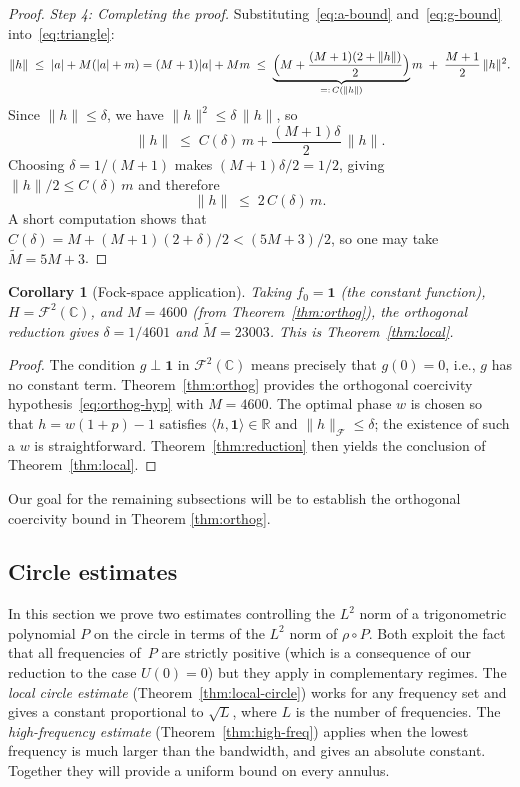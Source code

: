 \documentclass[11pt]{amsart}
\newtheorem{corollary}[theorem]{Corollary}
\theoremstyle{remark}
\begin{document}
\begin{proof}
\medskip
\noindent
\emph{Step 4: Completing the proof.}\;
Substituting~\eqref{eq:a-bound} and~\eqref{eq:g-bound}
into~\eqref{eq:triangle}:
\[
\lVert h \rVert
\;\le\;
\lvert a \rvert + M(\lvert a \rvert + m)
= (M+1)\lvert a \rvert + Mm
\;\le\;
\underbrace{\Bigl(M + \frac{(M+1)(2+\lVert h \rVert)}{2}\Bigr)}_{=:\, C(\lVert h \rVert)}
m
\;+\; \frac{M+1}{2}\,\lVert h \rVert^2.
\]
Since $\lVert h \rVert \le \delta$, we have $\lVert h \rVert^2 \le \delta\,\lVert h \rVert$, so
\[
\lVert h \rVert
\;\le\; C(\delta)\, m + \frac{(M+1)\delta}{2}\,\lVert h \rVert.
\]
Choosing $\delta = 1/(M+1)$ makes $(M+1)\delta/2 = 1/2$, giving
$\lVert h \rVert/2 \le C(\delta)\, m$ and therefore
\[
\lVert h \rVert \;\le\; 2\, C(\delta)\, m.
\]
A short computation shows that
$C(\delta) = M + (M+1)(2 + \delta)/2 < (5M+3)/2$, so one may take
$\widetilde{M} = 5M + 3$.
\end{proof}

\begin{corollary}[Fock-space application]\label{cor:fock-local}
Taking $f_0 = \mathbf{1}$ (the constant function), $H = \mathcal{F}^2(\mathbb{C})$, and
$M = 4600$ (from Theorem~\ref{thm:orthog}), the orthogonal reduction gives
$\delta = 1/4601$ and $\widetilde{M} = 23003$.
This is Theorem~\ref{thm:local}.
\end{corollary}

\begin{proof}
The condition $g \perp \mathbf{1}$ in $\mathcal{F}^2(\mathbb{C})$ means precisely that
$g(0) = 0$, i.e., $g$ has no constant term.
Theorem~\ref{thm:orthog} provides the orthogonal coercivity
hypothesis~\eqref{eq:orthog-hyp} with $M = 4600$.
The optimal phase $w$ is chosen so that
$h = w(1 + p) - 1$ satisfies $\langle h,\mathbf{1}\rangle \in \mathbb{R}$ and
$\lVert h \rVert_\mathcal{F} \le \delta$; the existence of such a $w$ is straightforward.
Theorem~\ref{thm:reduction} then yields the conclusion of
Theorem~\ref{thm:local}. 
\end{proof}
Our goal for the remaining subsections will  be to establish the orthogonal coercivity bound in Theorem  \ref{thm:orthog}.
 \subsection{Circle estimates}\label{subsec:circle}

In this section we prove two estimates controlling the $L^2$ norm of a
trigonometric polynomial $P$ on the circle in terms of the $L^2$ norm of
$\rho \circ P$.  Both exploit the fact that all frequencies of~$P$ are
strictly positive (which is a consequence of our reduction to the case $U(0)=0$) but they apply in
complementary regimes.  The \emph{local circle estimate}
(Theorem~\ref{thm:local-circle}) works for any frequency set and gives a
constant proportional to $\sqrt{L}$, where $L$ is the number of frequencies.
The \emph{high-frequency estimate} (Theorem~\ref{thm:high-freq}) applies
when the lowest frequency is much larger than the bandwidth, and gives an
absolute constant. Together they will provide a uniform bound on every
annulus.
\medskip
\end{document}

